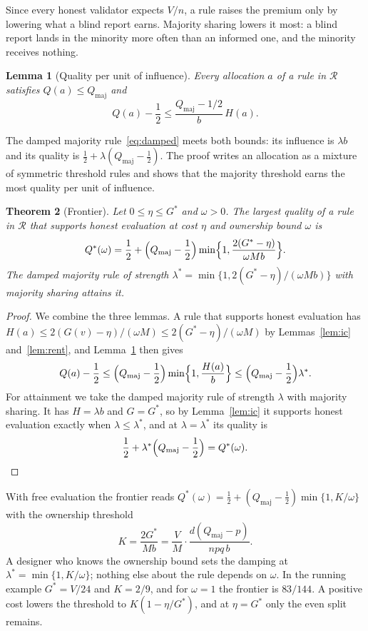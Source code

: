 \documentclass[sigconf,anonymous,review]{acmart}
\numberwithin{equation}{section}
\newtheorem{theorem}{Theorem}[section]
\newtheorem{lemma}[theorem]{Lemma}
\newcommand{\Qmaj}{Q_{\mathrm{maj}}}
\newcommand{\Gs}{G^{*}}
\newcommand{\Rset}{\mathcal{R}}
\begin{document}
Since every honest validator expects $V/n$, a rule raises the premium only by
lowering what a blind report earns. Majority sharing lowers it most: a blind
report lands in the minority more often than an informed one, and the minority
receives nothing.

\begin{lemma}[Quality per unit of influence]\label{lem:influence}
Every allocation $a$ of a rule in $\Rset$ satisfies $Q(a)\le\Qmaj$ and
\[
Q(a)-\frac12\le\frac{\Qmaj-1/2}{b}\,H(a).
\]
\end{lemma}

The damped majority rule~\eqref{eq:damped} meets both bounds: its influence is
$\lambda b$ and its quality is $\frac12+\lambda(\Qmaj-\frac12)$. The proof writes
an allocation as a mixture of symmetric threshold rules and shows that the
majority threshold earns the most quality per unit of influence.

\begin{theorem}[Frontier]\label{thm:frontier}
Let $0\le\eta\le\Gs$ and $\omega>0$. The largest quality of a rule in $\Rset$
that supports honest evaluation at cost $\eta$ and ownership bound $\omega$ is
\[
Q^*(\omega)=\frac12+\Bigl(\Qmaj-\frac12\Bigr)\min\Bigl\{1,\frac{2(\Gs-\eta)}{\omega Mb}\Bigr\}.
\]
The damped majority rule of strength
$\lambda^*=\min\{1,2(\Gs-\eta)/(\omega Mb)\}$ with majority sharing attains it.
\end{theorem}

\begin{proof}
We combine the three lemmas. A rule that supports honest evaluation has
$H(a)\le2(G(v)-\eta)/(\omega M)\le2(\Gs-\eta)/(\omega M)$ by
Lemmas~\ref{lem:ic} and~\ref{lem:rent}, and Lemma~\ref{lem:influence} then gives
\[
Q(a)-\frac12\le\Bigl(\Qmaj-\frac12\Bigr)\min\Bigl\{1,\frac{H(a)}b\Bigr\}
\le\Bigl(\Qmaj-\frac12\Bigr)\lambda^*.
\]
For attainment we take the damped majority rule of strength $\lambda$ with
majority sharing. It has $H=\lambda b$ and $G=\Gs$, so by Lemma~\ref{lem:ic} it
supports honest evaluation exactly when $\lambda\le\lambda^*$, and at
$\lambda=\lambda^*$ its quality is
\[
\frac12+\lambda^*\Bigl(\Qmaj-\frac12\Bigr)=Q^*(\omega).\qedhere
\]
\end{proof}

With free evaluation the frontier reads $Q^*(\omega)=\frac12+(\Qmaj-\frac12)\min\{1,K/\omega\}$
with the ownership threshold
\begin{equation}\label{eq:K}
K=\frac{2\Gs}{Mb}=\frac VM\cdot\frac{d(\Qmaj-p)}{npq\,b}.
\end{equation}
A designer who knows the ownership bound sets the damping at
$\lambda^*=\min\{1,K/\omega\}$; nothing else about the rule depends on
$\omega$. In the running example $\Gs=V/24$ and $K=2/9$, and for $\omega=1$ the
frontier is $83/144$. A positive cost lowers the threshold to
$K(1-\eta/\Gs)$, and at $\eta=\Gs$ only the even split remains.
\end{document}
